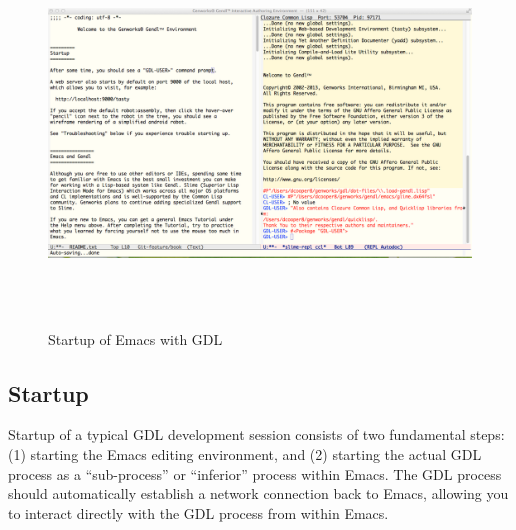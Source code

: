 \documentclass [11pt]{book}
\begin{document}
\begin{figure}
\begin{center}
\includegraphics[width=6in,height=4in]{../images/emacs-startup.png}
\end{center}

\caption{Startup of Emacs with GDL}

\label{fig:emacs-startup}

\end{figure}


\subsection{Startup}

\label{subsec:startup}

 Startup of a typical GDL development session consists of
two fundamental steps: (1) starting the Emacs editing environment,
and (2) starting the actual GDL process as a ``sub-process'' or ``inferior'' process 
within Emacs. The GDL process should automatically establish a network connection
back to Emacs, allowing you to interact directly with the GDL process from within Emacs.
\end{document}
